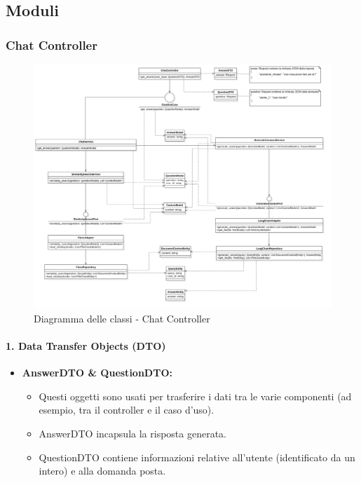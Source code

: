 \subsection{Moduli}

    \subsubsection{Chat Controller}

    \begin{figure}[H]
        \centering
        \includegraphics[width=\linewidth, height=0.8\textheight, keepaspectratio]{./img/png/Model1!ChatController_1.png}
        \caption{Diagramma delle classi - Chat Controller}
        \label{fig:chat_controller}
    \end{figure}

    \paragraph{1. Data Transfer Objects (DTO)}
    \begin{itemize}
        \item \textbf{AnswerDTO \& QuestionDTO:}
        \begin{itemize}
            \item Questi oggetti sono usati per trasferire i dati tra le varie componenti (ad esempio, tra il controller e il caso d’uso).
            \item AnswerDTO incapsula la risposta generata.
            \item QuestionDTO contiene informazioni relative all’utente (identificato da un intero) e alla domanda posta.
        \end{itemize}
    \end{itemize}

